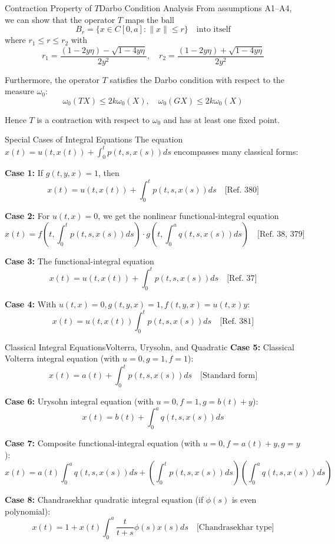 \documentclass[aspectratio=169,10pt]{beamer}
\begin{document}
\begin{frame}{Contraction Property of $T$}{Darbo Condition Analysis}
From assumptions A1--A4, we can show that the operator $T$ maps the ball
\[
B_r = \{x \in C[0, a] : \|x\| \leq r\} \quad \text{into itself}
\]
where $r_1 \leq r \leq r_2$ with
\[
r_1 = \frac{(1 - 2y\eta) - \sqrt{1 - 4y\eta}}{2y^2}, \quad r_2 = \frac{(1 - 2y\eta) + \sqrt{1 - 4y\eta}}{2y^2}
\]

\medskip

Furthermore, the operator $T$ satisfies the Darbo condition with respect to the measure $\omega_0$:
\[
\omega_0(TX) \leq 2k\omega_0(X), \quad \omega_0(GX) \leq 2k\omega_0(X)
\]

Hence $T$ is a contraction with respect to $\omega_0$ and has at least one fixed point.
\end{frame}

\begin{frame}[allowframebreaks]{Special Cases of Integral Equations}{}
The equation $x(t) = u(t, x(t)) + \int_0^t p(t, s, x(s)) ds$ encompasses many classical forms:

\medskip
\textbf{Case 1:} If $g(t, y, x) = 1$, then
\[
x(t) = u(t, x(t)) + \int_0^t p(t, s, x(s)) ds \quad \text{[Ref. 380]}
\]

\medskip
\textbf{Case 2:} For $u(t, x) = 0$, we get the nonlinear functional-integral equation
\[
x(t) = f\left(t, \int_0^t p(t, s, x(s)) ds\right) \cdot g\left(t, \int_0^a q(t, s, x(s)) ds\right) \quad \text{[Ref. 38, 379]}
\]

\medskip
\textbf{Case 3:} The functional-integral equation
\[
x(t) = u(t, x(t)) + \int_0^t p(t, s, x(s)) ds \quad \text{[Ref. 37]}
\]

\medskip
\textbf{Case 4:} With $u(t, x) = 0, g(t, y, x) = 1, f(t, y, x) = u(t, x)y$:
\[
x(t) = u(t, x(t)) \int_0^t p(t, s, x(s)) ds \quad \text{[Ref. 381]}
\]
\end{frame}

\begin{frame}[allowframebreaks]{Classical Integral Equations}{Volterra, Urysohn, and Quadratic}
\textbf{Case 5:} Classical Volterra integral equation (with $u=0, g=1, f=1$):
\[
x(t) = a(t) + \int_0^t p(t, s, x(s)) ds \quad \text{[Standard form]}
\]

\medskip
\textbf{Case 6:} Urysohn integral equation (with $u=0, f=1, g=b(t)+y$):
\[
x(t) = b(t) + \int_0^a q(t, s, x(s)) ds
\]

\medskip
\textbf{Case 7:} Composite functional-integral equation (with $u=0, f=a(t)+y, g=y$):
\[
x(t) = a(t) \int_0^a q(t, s, x(s)) ds + \left(\int_0^t p(t, s, x(s)) ds\right) \left(\int_0^a q(t, s, x(s)) ds\right)
\]

\medskip
\textbf{Case 8:} Chandrasekhar quadratic integral equation (if $\phi(s)$ is even polynomial):
\[
x(t) = 1 + x(t) \int_0^a \frac{t}{t + s} \phi(s) x(s) ds \quad \text{[Chandrasekhar type]}
\]
\end{frame}
\end{document}
